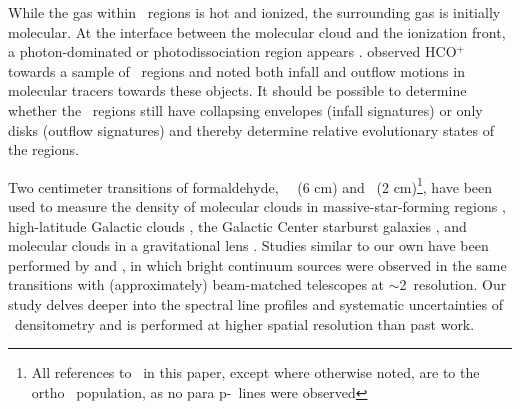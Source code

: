 
While the gas within \uchii\ regions is hot and ionized, the surrounding gas is
initially molecular.  At the interface between the molecular cloud and
the ionization front, a photon-dominated or photodissociation region appears
\citep{Roshi2005}.  \citet{Churchwell2010} observed HCO$^+$ towards a
sample of \uchii\ regions and noted both infall and outflow motions in
molecular tracers towards these objects.  It should be possible to determine
whether the \uchii\ regions still have collapsing envelopes (infall signatures)
or only disks (outflow signatures) and thereby determine relative evolutionary
states of the regions.

Two centimeter transitions of formaldehyde, \ortho\ \oneone\ (6 cm) and
\twotwo\ (2 cm)\footnote{All references to \formaldehyde\ in this paper,
except where otherwise noted, are to the ortho \ortho\ population, as no para p-\formaldehyde\ 
lines were observed}, have been used to measure the density of molecular
clouds in massive-star-forming regions \citep[e.g., ][]{Dickel1986,Dickel1987},
high-latitude Galactic clouds \citep[e.g., ][]{Turner1989}, the Galactic Center
\citep[e.g., ][]{Zylka1992} starburst galaxies \citep[e.g., ][]{Mangum2008}, and molecular clouds
in a gravitational lens \citep[e.g., ][]{Zeiger2010}.  Studies similar to our own have
been performed by \citet{Wadiak1988} and \citet{Henkel1983}, in which bright
continuum sources were observed in the same transitions with
(approximately) beam-matched telescopes at $\sim$2\arcmin\ resolution. Our
study delves deeper into the spectral line profiles and systematic uncertainties of
\formaldehyde\ densitometry and is performed at higher spatial resolution than
past work.


